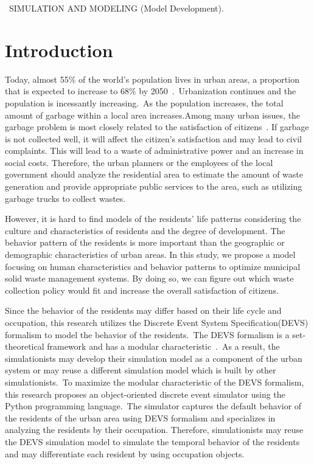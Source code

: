 \documentclass{scsSimAUDPaperFormat}
\begin{document}
 \
SIMULATION AND MODELING (Model Development).\\

\section{Introduction}
Today, almost 55\% of the world’s population lives in urban areas, a proportion that is expected to increase to 68\% by 2050~\cite{united20182018}.~Urbanization continues and the population is incessantly increasing.~As the population increases, the total amount of garbage within a local area increases.Among many urban issues, the garbage problem is most closely related to the satisfaction of citizens~\cite{mohit2010assessment}. If garbage is not collected well, it will affect the citizen’s satisfaction and may lead to civil complaints. This will lead to a waste of administrative power and an increase in social costs. Therefore, the urban planners or the employees of the local government should analyze the residential area to estimate the amount of waste generation and provide appropriate public services to the area, such as utilizing garbage trucks to collect wastes.
  
However, it is hard to find models of the residents' life patterns considering the culture and characteristics of residents and the degree of development. The behavior pattern of the residents is more important than the geographic or demographic characteristics of urban areas. In this study, we propose a model focusing on human characteristics and behavior patterns to optimize municipal solid waste management systems. By doing so, we can figure out which waste collection policy would fit and increase the overall satisfaction of citizens.

Since the behavior of the residents may differ based on their life cycle and occupation, this research utilizes the Discrete Event System Specification(DEVS) formalism to model the behavior of the residents.~The DEVS formalism
is a set-theoretical framework and has a modular characteristic~\cite{Zeigler84, Zeigler90, tms2000}.~As a result, the simulationists may develop their simulation model as a component of the urban system or may reuse a different simulation model which is built by other simulationists.~To maximize the modular characteristic of the DEVS formalism, this research proposes an object-oriented discrete event simulator using the Python programming language.~The simulator captures the default behavior of the residents of the urban area using DEVS formalism and specializes in analyzing the residents by their occupation. Therefore, simulationists may reuse the DEVS simulation model to simulate the temporal behavior of the residents and may differentiate each resident by using occupation objects.
\end{document}

